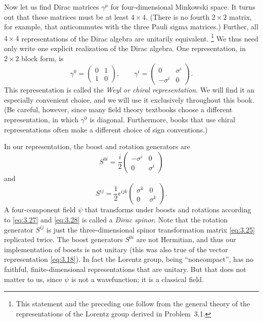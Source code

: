 Now let us find Dirac matrices $\gamma^\mu$ for four-dimensional Minkowski
space.  It turns out that these matrices must be at least $4\times4$.  (There
is no fourth $2\times2$ matrix, for example, that anticommutes with the three
Pauli sigma matrices.)  Further, all $4\times4$ representations of the Dirac
algebra are unitarily equivalent.%
\footnote{This statement and the preceding one follow from the general theory
of the representations of the Lorentz group derived in Problem~3.1.}  We thus
need only write one explicit realization of the Dirac algebra.  One
representation, in $2\times2$ block form, is
\begin{equation}
  \gamma^0 = \begin{pmatrix}0&1\\1&0\end{pmatrix},\qquad
  \gamma^i = \begin{pmatrix}0&\sigma^i\\ -\sigma^i&0\end{pmatrix}.
  \label{eq:3.26}
\end{equation}
This representation is called the \emph{Weyl or chiral representation}.  We
will find it an especially convenient choice, and we will use it exclusively
throughout this book.  (Be careful, however, since many field theory
textbooks choose a different representation, in which $\gamma^0$ is
diagonal.  Furthermore, books that use chiral representations often make a
different choice of sign conventions.)

In our representation, the boost and rotation generators are
\begin{equation}
  S^{0i} = \frac{i}{2}\begin{pmatrix}-\sigma^i&0\\0&\sigma^i\end{pmatrix}
  \label{eq:3.27}
\end{equation}
and
\begin{equation}
  S^{ij} = \frac{1}{2}\epsilon^{ijk}
    \begin{pmatrix}\sigma^k&0\\0&\sigma^k\end{pmatrix}.
  \label{eq:3.28}
\end{equation}
A four-component field $\psi$ that transforms under boosts and rotations
according to \eqref{eq:3.27} and \eqref{eq:3.28} is called a \emph{Dirac
spinor}.  Note that the rotation generator $S^{ij}$ is just the
three-dimensional spinor transformation matrix \eqref{eq:3.25} replicated
twice.  The boost generators $S^{0i}$ are not Hermitian, and thus our
implementation of boosts is not unitary (this was also true of the vector
representation \eqref{eq:3.18}).  In fact the Lorentz group, being
``noncompact'', has no faithful, finite-dimensional representations that are
unitary.  But that does not matter to us, since $\psi$ is not a wavefunction;
it is a classical field.

